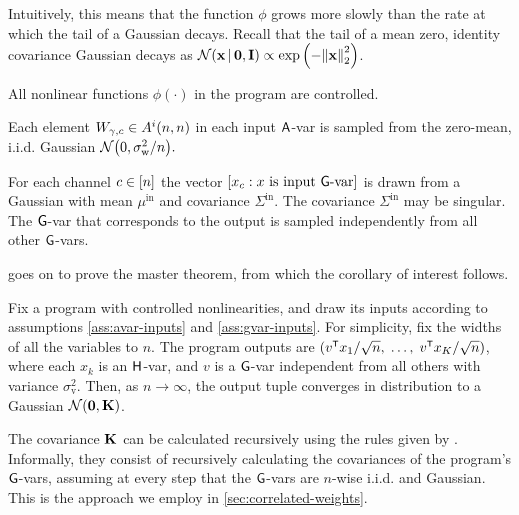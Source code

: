 {Intuitively, this means that the function $\phi$ grows
more slowly than the rate at which the tail of a Gaussian decays. Recall that the tail of a
mean zero, identity covariance Gaussian decays as 
$\mathcal{N}\bra{\vx \vbar {\boldsymbol{0}}, \eye} \propto \exp\bra{-\bracket{\|}{\|}{\vx}_2^2}$.

\begin{assumption}
  All nonlinear functions $\phi(\cdot)$ in the \Netsor program are controlled.
\end{assumption}

\begin{assumption}
  Each element $W_{\gamma,c} \in A^i(n, n)$ in each input $\mathsf{A}$-var is
  sampled from the zero-mean, i.i.d. Gaussian $\NormDist{0,
    \sigma_\text{w}^2/n}.$
  \label{ass:avar-inputs}
\end{assumption}
\begin{assumption}
  For each channel $c \in [n]$ the vector $[x_c : x\text{ is input
  }\mathsf{G}\text{-var}]$ is drawn from a Gaussian with mean $\mu^\text{in}$ and
  covariance $\Sigma^\text{in}$. The covariance $\Sigma^\text{in}$ may be
  singular. The $\mathsf{G}$-var that corresponds to the output is sampled
  independently from all other $\mathsf{G}$-vars.
  \label{ass:gvar-inputs}
\end{assumption}

\citet{yang2019wide} goes on to prove the \Netsor master theorem, from which
the corollary of interest follows.

\begin{corollary}
  Fix a \Netsor program with controlled nonlinearities, and draw its inputs
  according to assumptions \ref{ass:avar-inputs} and \ref{ass:gvar-inputs}. For simplicity, fix
  the widths of all the variables to $n$. The program outputs are $(v^\tp x_1/\sqrt{n}, \;\dots, \; v^\tp
  x_K/\sqrt{n})$, where
  each $x_k$ is an $\mathsf{H}$-var, and
    $v$ is a $\mathsf{G}$-var independent from all others with variance $\sigma^2_\text{v}$.
  Then, as $n \to \infty$, the output tuple
  converges in distribution to a Gaussian $\NormDist{{\boldsymbol{0}}, \vK}$.
  \label{corollary:netsor-gp}
\end{corollary}

The covariance $\mathbf{K}$ can be calculated recursively using the rules given by
\citet{yang2019wide}. Informally, they consist of recursively calculating the covariances
of the
program's $\mathsf{G}$-vars, assuming at every step that the $\mathsf{G}$-vars are $n$-wise
i.i.d. and Gaussian. This is the approach we employ in \cref{sec:correlated-weights}.

}
